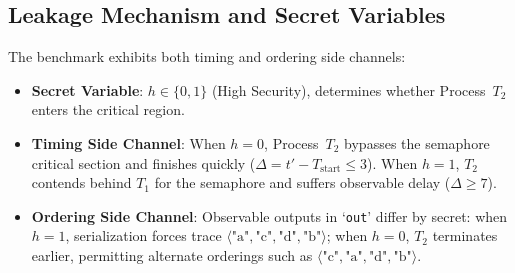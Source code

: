 \documentclass[a4paper,12pt]{report}
\begin{document}
\subsection{Leakage Mechanism and Secret Variables}
The benchmark exhibits both timing and ordering side channels:
\begin{itemize}[itemsep=0.05em, topsep=0.04em]
    \item \textbf{Secret Variable}: $h \in \{0, 1\}$ (High Security), determines whether Process~$T_2$ enters the critical region.
    \item \textbf{Timing Side Channel}: When $h = 0$, Process~$T_2$ bypasses the semaphore critical section and finishes quickly ($\Delta = t' - T_{\text{start}} \le 3$). When $h = 1$, $T_2$ contends behind $T_1$ for the semaphore and suffers observable delay ($\Delta \ge 7$).
    \item \textbf{Ordering Side Channel}: Observable outputs in `\texttt{out}' differ by secret: when $h = 1$, serialization forces trace $\langle \text{"a"}, \text{"c"}, \text{"d"}, \text{"b"} \rangle$; when $h = 0$, $T_2$ terminates earlier, permitting alternate orderings such as $\langle \text{"c"}, \text{"a"}, \text{"d"}, \text{"b"} \rangle$.
\end{itemize}
\end{document}
